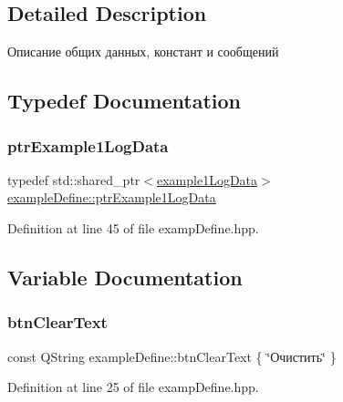 \subsection{Detailed Description}
Описание общих данных, констант и сообщений 

\subsection{Typedef Documentation}
\mbox{\label{namespaceexample_define_a52b69908c42e1ef6c8db4fa83f882a8d}} 
\subsubsection{\texorpdfstring{ptr\+Example1\+Log\+Data}{ptrExample1LogData}}
{\footnotesize\ttfamily typedef std\+::shared\+\_\+ptr$<$\hyperlink{structexample_define_1_1example1_log_data}{example1\+Log\+Data}$>$ \hyperlink{namespaceexample_define_a52b69908c42e1ef6c8db4fa83f882a8d}{example\+Define\+::ptr\+Example1\+Log\+Data}}



Definition at line 45 of file examp\+Define.\+hpp.



\subsection{Variable Documentation}
\mbox{\label{namespaceexample_define_ad7fcdbb594190a717d729674bded61af}} 
\subsubsection{\texorpdfstring{btn\+Clear\+Text}{btnClearText}}
{\footnotesize\ttfamily const Q\+String example\+Define\+::btn\+Clear\+Text \{ \char`\"{}Очистить\char`\"{} \}}



Definition at line 25 of file examp\+Define.\+hpp.

\mbox{\label{namespaceexample_define_a4453a1a01e6af412bb1e5827536ae5f6}} 
